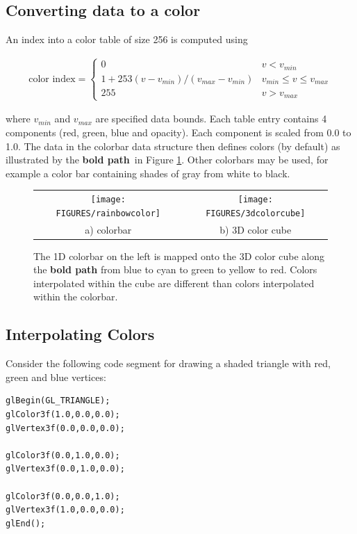 \documentclass[11pt,twoside]{book}
\begin{document}
\subsection{Converting data to a color}
An index into a color table of size 256 is computed using

\begin{eqnarray}
\mbox{color index}=\left\{
\begin{array}{ll}
  0 & v < v_{min}\\
  1+253(v-v_{min})/(v_{max}-v_{min}) & v_{min}\le v \le v_{max} \\
  255 & v > v_{max}
\end{array}
\right.
\end{eqnarray}

\noindent where $v_{min}$ and $v_{max}$ are specified data bounds.  Each table entry contains 4 components (red, green, blue and opacity).  Each component is scaled from 0.0 to 1.0.  The data in the colorbar data structure then defines colors (by default) as illustrated by the {\bf bold path}\ in Figure \ref{colorbarinfo}.  Other colorbars may be used, for example a color bar containing shades of gray from white to black.


\begin{figure}[\figoptions]
\begin{center}
\begin{tabular}{cc}
\texttt{[image: FIGURES/rainbowcolor]}&\texttt{[image: FIGURES/3dcolorcube]}\\
a) colorbar&b) 3D color cube\\
\end{tabular}
\end{center}
\caption[1D colorbar and 3D color cube]{The 1D colorbar on the left is mapped onto the 3D color cube
along the {\bf bold path} from blue to cyan to green to yellow to red.  Colors interpolated within the cube are different than colors interpolated within the colorbar.}
\label{colorbarinfo}%
\end{figure}

\subsection{Interpolating Colors}

Consider the following code segment for drawing a shaded triangle with red, green and blue vertices:
\begin{lstlisting}
glBegin(GL_TRIANGLE);
glColor3f(1.0,0.0,0.0);
glVertex3f(0.0,0.0,0.0);

glColor3f(0.0,1.0,0.0);
glVertex3f(0.0,1.0,0.0);

glColor3f(0.0,0.0,1.0);
glVertex3f(1.0,0.0,0.0);
glEnd();
\end{lstlisting}
\end{document}
